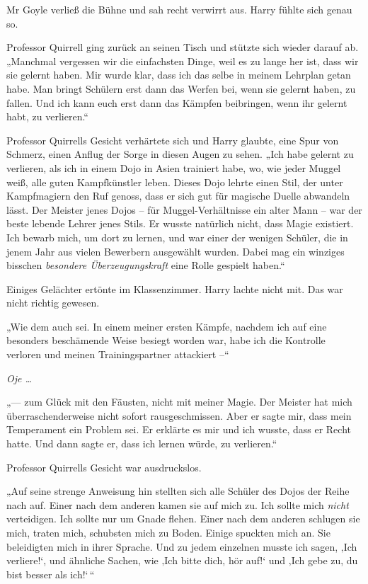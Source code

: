 {Mr Goyle verließ die Bühne und sah recht verwirrt aus. Harry fühlte sich genau so.

Professor Quirrell ging zurück an seinen Tisch und stützte sich wieder darauf ab. „Manchmal vergessen wir die einfachsten Dinge, weil es zu lange her ist, dass wir sie gelernt haben. Mir wurde klar, dass ich das selbe in meinem Lehrplan getan habe. Man bringt Schülern erst dann das Werfen bei, wenn sie gelernt haben, zu fallen. Und ich kann euch erst dann das Kämpfen beibringen, wenn ihr gelernt habt, zu verlieren.“

Professor Quirrells Gesicht verhärtete sich und Harry glaubte, eine Spur von Schmerz, einen Anflug der Sorge in diesen Augen zu sehen. „Ich habe gelernt zu verlieren, als ich in einem Dojo in Asien trainiert habe, wo, wie jeder Muggel weiß, alle guten Kampfkünstler leben. Dieses Dojo lehrte einen Stil, der unter Kampfmagiern den Ruf genoss, dass er sich gut für magische Duelle abwandeln lässt. Der Meister jenes Dojos -- für Muggel-Verhältnisse ein alter Mann -- war der beste lebende Lehrer jenes Stils. Er wusste natürlich nicht, dass Magie existiert. Ich bewarb mich, um dort zu lernen, und war einer der wenigen Schüler, die in jenem Jahr aus vielen Bewerbern ausgewählt wurden. Dabei mag ein winziges bisschen \emph{besondere Überzeugungskraft} eine Rolle gespielt haben.“

Einiges Gelächter ertönte im Klassenzimmer. Harry lachte nicht mit. Das war nicht richtig gewesen.

„Wie dem auch sei. In einem meiner ersten Kämpfe, nachdem ich auf eine besonders beschämende Weise besiegt worden war, habe ich die Kontrolle verloren und meinen Trainingspartner attackiert --“

\emph{Oje …}

„--- zum Glück mit den Fäusten, nicht mit meiner Magie. Der Meister hat mich überraschenderweise nicht sofort rausgeschmissen. Aber er sagte mir, dass mein Temperament ein Problem sei. Er erklärte es mir und ich wusste, dass er Recht hatte. Und dann sagte er, dass ich lernen würde, zu verlieren.“

Professor Quirrells Gesicht war ausdruckslos.

„Auf seine strenge Anweisung hin stellten sich alle Schüler des Dojos der Reihe nach auf. Einer nach dem anderen kamen sie auf mich zu. Ich sollte mich \emph{nicht} verteidigen. Ich sollte nur um Gnade flehen. Einer nach dem anderen schlugen sie mich, traten mich, schubsten mich zu Boden. Einige spuckten mich an. Sie beleidigten mich in ihrer Sprache. Und zu jedem einzelnen musste ich sagen, ‚Ich verliere!`, und ähnliche Sachen, wie ‚Ich bitte dich, hör auf!` und ‚Ich gebe zu, du bist besser als ich!`\,“

}
